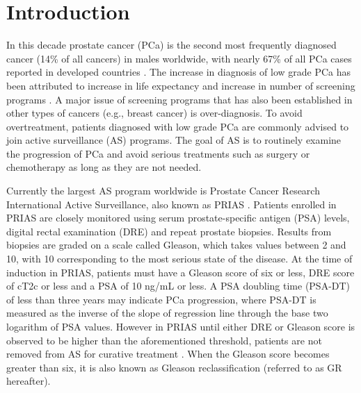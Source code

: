 \section{Introduction}
\label{sec : introduction}
In this decade prostate cancer (PCa) is the second most frequently diagnosed cancer (14\% of all cancers) in males worldwide, with nearly 67\% of all PCa cases reported in developed countries \citep{GlobalCancerStats2012}. The increase in diagnosis of low grade PCa has been attributed to increase in life expectancy and increase in number of screening programs \citep{potoskyPSAcancer}. A major issue of screening programs that has also been established in other types of cancers (e.g., breast cancer) is over-diagnosis. To avoid overtreatment, patients diagnosed with low grade PCa are commonly advised to join active surveillance (AS) programs. The goal of AS is to routinely examine the progression of PCa and avoid serious treatments such as surgery or chemotherapy as long as they are not needed.

Currently the largest AS program worldwide is Prostate Cancer Research International Active Surveillance, also known as PRIAS \citep{bokhorst2016decade}. Patients enrolled in PRIAS are closely monitored using serum prostate-specific antigen (PSA) levels, digital rectal examination (DRE) and repeat prostate biopsies. Results from biopsies are graded on a scale called Gleason, which takes values between 2 and 10, with 10 corresponding to the most serious state of the disease. At the time of induction in PRIAS, patients must have a Gleason score of six or less, DRE score of cT2c or less and a PSA of 10 ng/mL or less. A PSA doubling time (PSA-DT) of less than three years may indicate PCa progression, where PSA-DT is measured as the inverse of the slope of regression line through the base two logarithm of PSA values. However in PRIAS until either DRE or Gleason score is observed to be higher than the aforementioned threshold, patients are not removed from AS for curative treatment \citep{bokhorst2016decade}. When the Gleason score becomes greater than six, it is also known as Gleason reclassification (referred to as GR hereafter).

